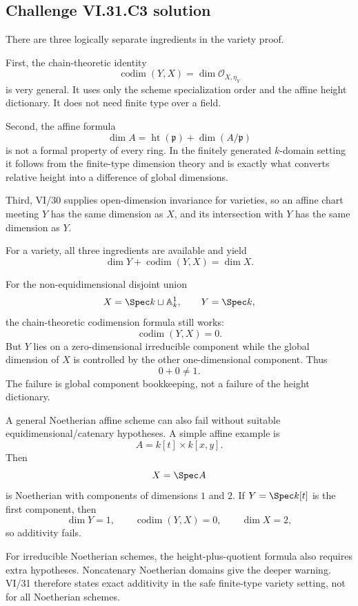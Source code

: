 \subsection*{Challenge VI.31.C3 solution}
\begin{solution}
There are three logically separate ingredients in the variety proof.

First, the chain-theoretic identity
\[
\operatorname{codim}(Y,X)
=
\dim\mathcal O_{X,\eta_Y}
\]
is very general.  It uses only the scheme specialization order and the affine height dictionary.  It does not
need finite type over a field.

Second, the affine formula
\[
\dim A
=
\operatorname{ht}(\mathfrak p)+\dim(A/\mathfrak p)
\]
is not a formal property of every ring.  In the finitely generated \(k\)-domain setting it follows from the
finite-type dimension theory and is exactly what converts relative height into a difference of global
dimensions.

Third, VI/30 supplies open-dimension invariance for varieties, so an affine chart meeting \(Y\) has the same
dimension as \(X\), and its intersection with \(Y\) has the same dimension as \(Y\).

For a variety, all three ingredients are available and yield
\[
\boxed{
\dim Y+\operatorname{codim}(Y,X)=\dim X.
}
\]

For the non-equidimensional disjoint union
\[
X=\Spec k\sqcup\mathbb A^1_k,
\qquad
Y=\Spec k,
\]
the chain-theoretic codimension formula still works:
\[
\operatorname{codim}(Y,X)=0.
\]
But \(Y\) lies on a zero-dimensional irreducible component while the global dimension of \(X\) is controlled by
the other one-dimensional component.  Thus
\[
0+0\ne1.
\]
The failure is global component bookkeeping, not a failure of the height dictionary.

A general Noetherian affine scheme can also fail without suitable equidimensional/catenary hypotheses.  A simple
affine example is
\[
A=k[t]\times k[x,y].
\]
Then
\[
X=\Spec A
\]
is Noetherian with components of dimensions \(1\) and \(2\).  If \(Y=\Spec k[t]\) is the first component, then
\[
\dim Y=1,\qquad
\operatorname{codim}(Y,X)=0,\qquad
\dim X=2,
\]
so additivity fails.

For irreducible Noetherian schemes, the height-plus-quotient formula also requires extra hypotheses.
Noncatenary Noetherian domains give the deeper warning.  VI/31 therefore states exact additivity in the safe
finite-type variety setting, not for all Noetherian schemes.
\end{solution}

